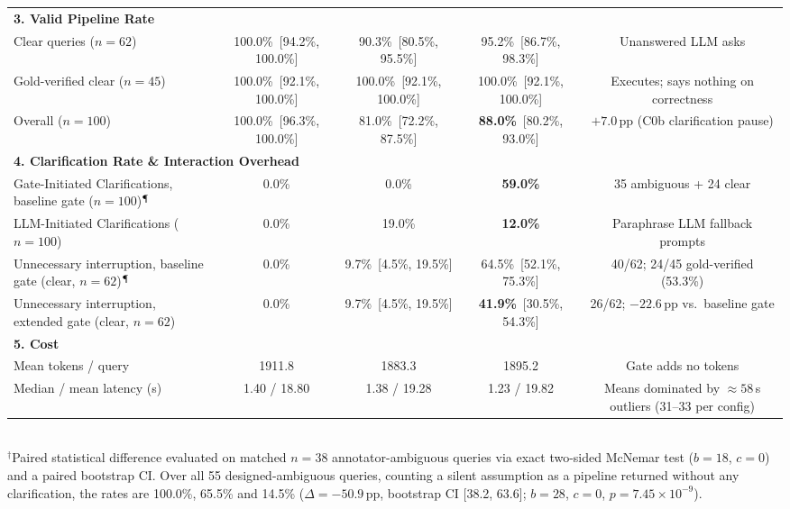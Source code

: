 \begin{table}[t]
{\begin{tabular}{lcccc}
\midrule
\multicolumn{5}{l}{\textbf{3. Valid Pipeline Rate}} \\
\quad Clear queries ($n = 62$) & 100.0\%~{\scriptsize[94.2\%, 100.0\%]} & 90.3\%~{\scriptsize[80.5\%, 95.5\%]} & 95.2\%~{\scriptsize[86.7\%, 98.3\%]} & Unanswered LLM asks \\
\quad Gold-verified clear ($n = 45$) & 100.0\%~{\scriptsize[92.1\%, 100.0\%]} & 100.0\%~{\scriptsize[92.1\%, 100.0\%]} & 100.0\%~{\scriptsize[92.1\%, 100.0\%]} & Executes; says nothing on correctness \\
\quad Overall ($n = 100$) & 100.0\%~{\scriptsize[96.3\%, 100.0\%]} & 81.0\%~{\scriptsize[72.2\%, 87.5\%]} & \textbf{88.0\%}~{\scriptsize[80.2\%, 93.0\%]} & $+7.0\,\text{pp}$ (C0b clarification pause) \\
\midrule
\multicolumn{5}{l}{\textbf{4. Clarification Rate \& Interaction Overhead}} \\
\quad Gate-Initiated Clarifications, baseline gate ($n = 100$)$^{\mathparagraph}$ & 0.0\% & 0.0\% & \textbf{59.0\%} & 35 ambiguous + 24 clear \\
\quad LLM-Initiated Clarifications ($n = 100$) & 0.0\% & 19.0\% & \textbf{12.0\%} & Paraphrase LLM fallback prompts \\
\quad Unnecessary interruption, baseline gate (clear, $n = 62$)$^{\mathparagraph}$ & 0.0\% & 9.7\%~{\scriptsize[4.5\%, 19.5\%]} & 64.5\%~{\scriptsize[52.1\%, 75.3\%]} & 40/62; 24/45 gold-verified (53.3\%) \\
\quad Unnecessary interruption, extended gate (clear, $n = 62$) & 0.0\% & 9.7\%~{\scriptsize[4.5\%, 19.5\%]} & \textbf{41.9\%}~{\scriptsize[30.5\%, 54.3\%]} & 26/62; $-22.6$\,pp vs.\ baseline gate \\
\midrule
\multicolumn{5}{l}{\textbf{5. Cost}} \\
\quad Mean tokens / query & 1911.8 & 1883.3 & 1895.2 & Gate adds no tokens \\
\quad Median / mean latency (s) & 1.40 / 18.80 & 1.38 / 19.28 & 1.23 / 19.82 & Means dominated by ${\approx}58$\,s outliers (31--33 per config) \\
\bottomrule
\end{tabular}%
}
\\[2pt]
\footnotesize{$^{\dagger}$Paired statistical difference evaluated on matched $n = 38$ annotator-ambiguous queries via exact two-sided McNemar test ($b = 18$, $c = 0$) and a paired bootstrap CI. Over all 55 designed-ambiguous queries, counting a silent assumption as a pipeline returned without any clarification, the rates are 100.0\%, 65.5\% and 14.5\% ($\Delta = -50.9\,\text{pp}$, bootstrap CI [38.2, 63.6]; $b = 28$, $c = 0$, $p = 7.45\times 10^{-9}$).}\\

\end{table}
